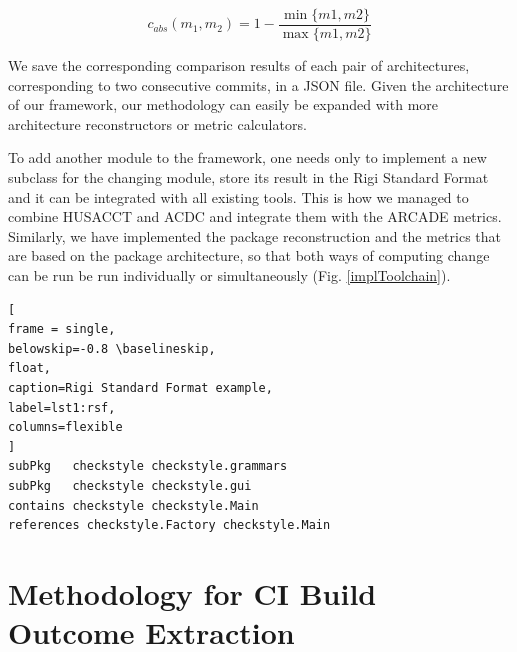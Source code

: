 \documentclass[sigconf, anonymous, review]{acmart}
\begin{document}
\begin{equation} \label{eq:absDiff}
	c_{abs}(m_1, m_2) = 1 - \frac{\min\{m1, m2\}}{\max\{m1, m2\}}
\end{equation} 


We save the corresponding comparison results of each pair of architectures, corresponding to two consecutive commits, in a JSON file. Given the architecture of our framework, our methodology can easily be expanded with more architecture reconstructors or metric calculators. 

To add another module to the framework, one needs only to implement a new subclass for the changing module, store its result in the Rigi Standard Format and it can be integrated with all existing tools. 
This is how we managed to combine HUSACCT and ACDC and integrate them with the ARCADE metrics. Similarly, we have implemented the package reconstruction and the metrics that are based on the package architecture, so that both ways of computing change can be run be run individually or simultaneously (Fig. \ref{implToolchain}).

\begin{lstlisting}[
frame = single, 
belowskip=-0.8 \baselineskip,
float,
caption=Rigi Standard Format example,
label=lst1:rsf,
columns=flexible
]
subPkg   checkstyle checkstyle.grammars
subPkg   checkstyle checkstyle.gui
contains checkstyle checkstyle.Main
references checkstyle.Factory checkstyle.Main
\end{lstlisting}

\section{Methodology for CI Build Outcome Extraction}
\label{sec:ci-build-outcome}
\end{document}
